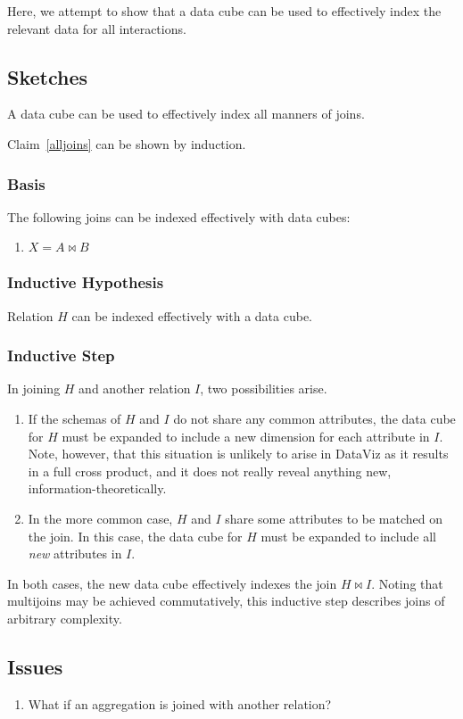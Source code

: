 Here, we attempt to show that a data cube can be used to effectively index the relevant data for all interactions.
\subsection{Sketches}
\begin{claim}\label{alljoins}
A data cube can be used to effectively index all manners of joins.
\end{claim}
\begin{sketch}
Claim~\ref{alljoins} can be shown by induction.
\subsubsection*{Basis}
The following joins can be indexed effectively with data cubes:
\begin{enumerate}
	\item $X = A\bowtie{}B$
\end{enumerate}
\subsubsection*{Inductive Hypothesis}
Relation $H$ can be indexed effectively with a data cube.
\subsubsection*{Inductive Step}
In joining $H$ and another relation $I$, two possibilities arise.
\begin{enumerate}
	\item If the schemas of $H$ and $I$ do not share any common attributes, the data cube for $H$ must be expanded to include a new dimension for each attribute in $I$.
	Note, however, that this situation is unlikely to arise in DataViz as it results in a full cross product, and it does not really reveal anything new, information-theoretically.
	\item In the more common case, $H$ and $I$ share some attributes to be matched on the join.
	In this case, the data cube for $H$ must be expanded to include all \textit{new} attributes in $I$.
\end{enumerate}
In both cases, the new data cube effectively indexes the join $H\bowtie{}I$.
Noting that multijoins may be achieved commutatively, this inductive step describes joins of arbitrary complexity.
\end{sketch}
\subsection{Issues}
\begin{enumerate}
	\item What if an aggregation is joined with another relation?
\end{enumerate}